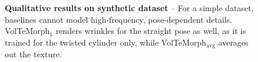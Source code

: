 \begin{figure}[t]
  \centering
  \resizebox{0.8\linewidth}{!}{\versionone}
  \caption[Qualitative results of \blendfields and chosen baselines on the synthetic dataset]{\textbf{Qualitative results on synthetic dataset} --  For a simple dataset, baselines cannot model high-frequency, pose-dependent details.
    VolTeMorph$_1$ renders wrinkles for the straight pose as well, as it is
    trained for the twisted cylinder only, while VolTeMorph$_\text{avg}$ averages
    out the texture.
  }
  \label{fig:blendfields-synthetic-qualitative}
\end{figure}